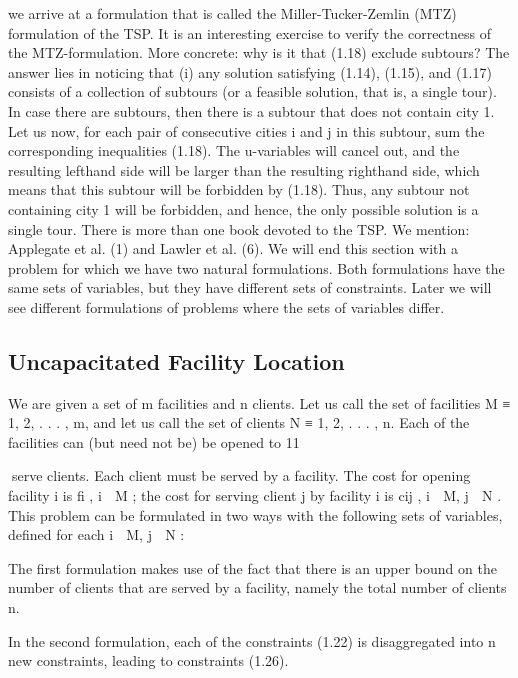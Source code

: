 \documentclass[titlepage]{book}
\begin{document}
we arrive at a formulation that is called the Miller-Tucker-Zemlin (MTZ) formulation of the TSP. It is
an interesting exercise to verify the correctness of the MTZ-formulation. More concrete: why is it that
(1.18) exclude subtours? The answer lies in noticing that (i) any solution satisfying (1.14), (1.15), and
(1.17) consists of a collection of subtours (or a feasible solution, that is, a single tour). In case there are
subtours, then there is a subtour that does not contain city 1. Let us now, for each pair of consecutive
cities i and j in this subtour, sum the corresponding inequalities (1.18). The u-variables will cancel out,
and the resulting lefthand side will be larger than the resulting righthand side, which means that this
subtour will be forbidden by (1.18). Thus, any subtour not containing city 1 will be forbidden, and hence,
the only possible solution is a single tour.
There is more than one book devoted to the TSP. We mention: Applegate et al. (1) and Lawler et al. (6).
We will end this section with a problem for which we have two natural formulations. Both formulations
have the same sets of variables, but they have different sets of constraints. Later we will see different
formulations of problems where the sets of variables differ.

\subsection{Uncapacitated Facility Location}

We are given a set of m facilities and n clients. Let us call the set of facilities M ≡ {1, 2, . . . , m}, and
let us call the set of clients N ≡ {1, 2, . . . , n}. Each of the facilities can (but need not be) be opened to
11

serve clients. Each client must be served by a facility. The cost for opening facility i is fi , i ∈ M ; the
cost for serving client j by facility i is cij , i ∈ M, j ∈ N . This problem can be formulated in two ways
with the following sets of variables, defined for each i ∈ M, j ∈ N :


The first formulation makes use of the fact that there is an upper bound on the number of clients that
are served by a facility, namely the total number of clients n.


In the second formulation, each of the constraints (1.22) is disaggregated into n new constraints, leading
to constraints (1.26).
\end{document}
